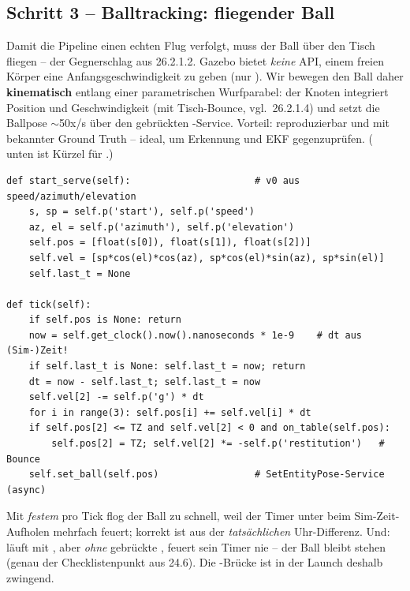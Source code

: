 \subsection{Schritt 3 -- Balltracking: fliegender Ball}
Damit die Pipeline einen echten Flug verfolgt, muss der Ball über den Tisch
fliegen -- der Gegnerschlag aus 26.2.1.2. Gazebo bietet \emph{keine} API, einem
freien Körper eine Anfangsgeschwindigkeit zu geben (nur ). Wir
bewegen den Ball daher \textbf{kinematisch} entlang einer parametrischen
Wurfparabel: der Knoten  integriert Position und
Geschwindigkeit (mit Tisch-Bounce, vgl.\ 26.2.1.4) und setzt die Ballpose
$\sim$50x/s über den gebrückten -Service. Vorteil:
reproduzierbar und mit bekannter Ground Truth -- ideal, um Erkennung und EKF
gegenzuprüfen. ( unten ist Kürzel für
.)
\begin{lstlisting}[style=py,caption={\code{opponent\_serve} -- Kern (Wurf + Bounce)}]
def start_serve(self):                      # v0 aus speed/azimuth/elevation
    s, sp = self.p('start'), self.p('speed')
    az, el = self.p('azimuth'), self.p('elevation')
    self.pos = [float(s[0]), float(s[1]), float(s[2])]
    self.vel = [sp*cos(el)*cos(az), sp*cos(el)*sin(az), sp*sin(el)]
    self.last_t = None

def tick(self):
    if self.pos is None: return
    now = self.get_clock().now().nanoseconds * 1e-9    # dt aus (Sim-)Zeit!
    if self.last_t is None: self.last_t = now; return
    dt = now - self.last_t; self.last_t = now
    self.vel[2] -= self.p('g') * dt
    for i in range(3): self.pos[i] += self.vel[i] * dt
    if self.pos[2] <= TZ and self.vel[2] < 0 and on_table(self.pos):
        self.pos[2] = TZ; self.vel[2] *= -self.p('restitution')   # Bounce
    self.set_ball(self.pos)                 # SetEntityPose-Service (async)
\end{lstlisting}

\begin{infobox}[title={Lehre: dt aus der Uhr -- und \code{use\_sim\_time} braucht /clock}]
Mit \emph{festem}  pro Tick flog der Ball zu schnell, weil der Timer
unter  beim Sim-Zeit-Aufholen mehrfach feuert; korrekt ist
 aus der \emph{tatsächlichen} Uhr-Differenz. Und: läuft
 mit , aber \emph{ohne} gebrückte
, feuert sein Timer nie -- der Ball bleibt stehen (genau der
Checklistenpunkt aus 24.6). Die -Brücke ist in der Launch deshalb
zwingend.
\end{infobox}

